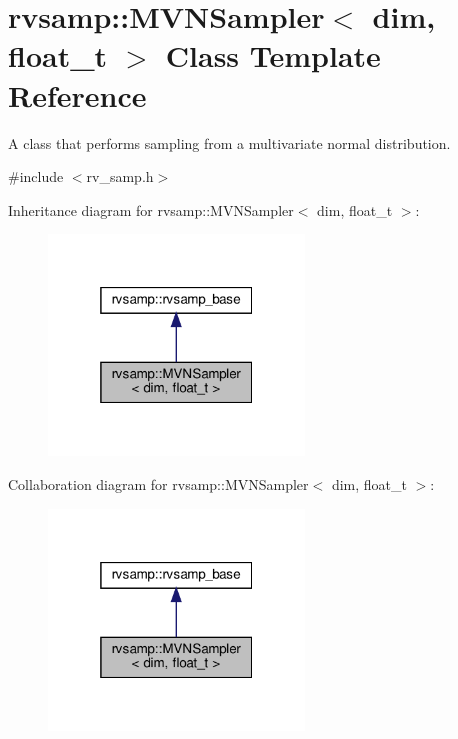 \hypertarget{classrvsamp_1_1MVNSampler}{}\section{rvsamp\+:\+:M\+V\+N\+Sampler$<$ dim, float\+\_\+t $>$ Class Template Reference}
\label{classrvsamp_1_1MVNSampler}


A class that performs sampling from a multivariate normal distribution.  




{\ttfamily \#include $<$rv\+\_\+samp.\+h$>$}



Inheritance diagram for rvsamp\+:\+:M\+V\+N\+Sampler$<$ dim, float\+\_\+t $>$\+:\nopagebreak
\begin{figure}[H]
\begin{center}
\leavevmode
\includegraphics[width=193pt]{classrvsamp_1_1MVNSampler__inherit__graph}
\end{center}
\end{figure}


Collaboration diagram for rvsamp\+:\+:M\+V\+N\+Sampler$<$ dim, float\+\_\+t $>$\+:\nopagebreak
\begin{figure}[H]
\begin{center}
\leavevmode
\includegraphics[width=193pt]{classrvsamp_1_1MVNSampler__coll__graph}
\end{center}
\end{figure}

